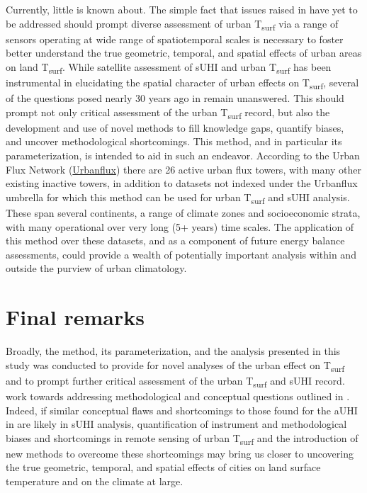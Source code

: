 \begin{bibunit}
Currently, little is known about. The simple fact that issues raised in have yet to be addressed should prompt diverse assessment of urban T\textsubscript{surf} via a range of sensors operating at wide range of spatiotemporal scales is necessary to foster better understand the true geometric, temporal, and spatial effects of urban areas on land T\textsubscript{surf}. While satellite assessment of sUHI and urban T\textsubscript{surf} has been instrumental in elucidating the spatial character of urban effects on T\textsubscript{surf}, several of the questions posed nearly 30 years ago in \citet{Roth1989} remain unanswered. This should prompt not only critical assessment of the urban T\textsubscript{surf} record, but also the development and use of novel methods to fill knowledge gaps, quantify biases, and uncover methodological shortcomings. This method, and in particular its parameterization, is intended to aid in such an endeavor. According to the Urban Flux Network (\href{http://fluxnet.fluxdata.org/}{Urbanflux}) there are 26 active urban flux towers, with many other existing inactive towers, in addition to datasets not indexed under the Urbanflux umbrella for which this method can be used for urban T\textsubscript{surf} and sUHI analysis. These span several continents, a range of climate zones and socioeconomic strata, with many operational over very long (5+ years) time scales. The application of this method over these datasets, and as a component of future energy balance assessments, could provide a wealth of potentially important analysis within and outside the purview of urban climatology.

\section{Final remarks}


Broadly, the method, its parameterization, and the analysis presented in this study was conducted to provide for novel analyses of the urban effect on T\textsubscript{surf} and to prompt further critical assessment of the urban T\textsubscript{surf} and sUHI record.  work towards addressing methodological and conceptual questions outlined in \citet{Roth1989}. Indeed, if similar conceptual flaws and shortcomings to those found for the aUHI in \citet{Stewart2011} are likely in sUHI analysis, quantification of instrument and methodological biases and shortcomings in remote sensing of urban T\textsubscript{surf} and the introduction of new methods to overcome these shortcomings may bring us closer to uncovering the true geometric, temporal, and spatial effects of cities on land surface temperature and on the climate at large.

\cleardoublepage 
{}  
\renewcommand*{\bibname}{References}


\putbib
\end{bibunit}